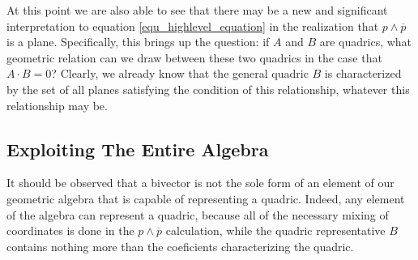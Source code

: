 \documentclass{ecgd-l}
\theoremstyle{definition}
\theoremstyle{remark}
\numberwithin{equation}{section}
\begin{document}
At this point we are also able to see that there may be a new
and significant interpretation to equation \eqref{equ_highlevel_equation}
in the realization that $p\wedge\overline{p}$ is a plane.  Specifically,
this brings up the question: if $A$ and $B$ are quadrics, what geometric
relation can we draw between these two quadrics in the case that
$A\cdot B=0$?  Clearly, we already know that the general
quadric $B$ is characterized by the set of all planes satisfying
the condition of this relationship, whatever this relationship may be.




\subsection{Exploiting The Entire Algebra}

It should be observed that a bivector is not the sole form of an
element of our geometric algebra that is capable of representing
a quadric.  Indeed, any element of the algebra can represent a quadric,
because all of the necessary mixing of coordinates is done in the
$p\wedge\overline{p}$ calculation, while the quadric representative
$B$ contains nothing more than the coeficients characterizing the quadric.




\end{document}
